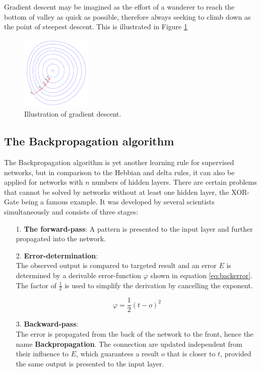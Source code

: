 \documentclass[10pt,a4paper,DIV=11]{scrreprt}
\begin{document}
Gradient descent may be imagined as the effort of a wanderer to reach the bottom of valley as quick as possible, therefore always seeking to climb down as the point of steepest descent. This is illustrated in Figure \ref{fig:grad}

\begin{figure}
    \centering
    \includegraphics[width=0.3\textwidth,scale=1]{files/graddes.png}  
    \caption{Illustration of gradient descent.\cite{GRADFIG}}
    \label{fig:grad}
\end{figure}

\subsection{The Backpropagation algorithm}

The Backpropagation algorithm is yet another learning rule for supervised networks, but in comparison to the Hebbian and delta rules, it can also be applied for networks with $n$ numbers of hidden layers. There are certain problems that cannot be solved by networks without at least one hidden layer, the XOR-Gate being a famous example. 
It was developed by several scientists simultaneously \cite{BACK1}\cite{BACK2}\cite{BACK3} and consists of three stages:
\begin{itemize}
\item[1.] \textbf{The forward-pass}:
A pattern is presented to the input layer and further propagated into the network.
\item[2.] \textbf{Error-determination}:\\
The observed output is compared to targeted result and an error $E$ is determined by a derivable error-function $\varphi$ shown in equation \eqref{eq:backerror}. The factor of $\frac{1}{2}$ is used to simplify the derivation by cancelling the exponent.

\begin{equation}
\varphi = \frac{1}{2} (t-o)^2
\label{eq:backerror}
\end{equation}
\item[3.] \textbf{Backward-pass}:\\
The error is propagated from the back of the network to the front, hence the name \textbf{Backpropagation}. The connection are updated independent from their influence to $E$, which guarantees a result $o$ that is closer to $t$, provided the same output is presented to the input layer.
\end{itemize}
\end{document}
